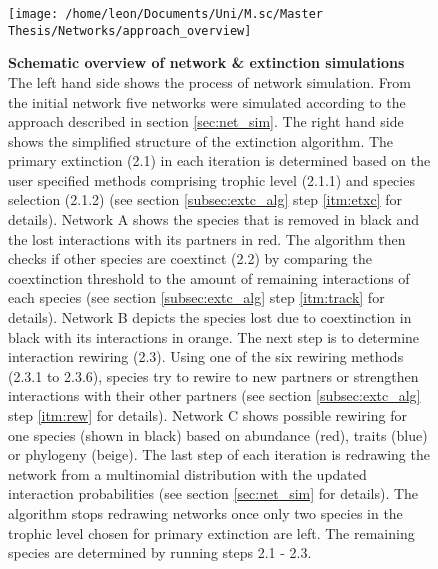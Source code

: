 \documentclass[12pt,a4paper]{article}
\begin{document}
	\begin{figure}[H]
	 \texttt{[image: /home/leon/Documents/Uni/M.sc/Master Thesis/Networks/approach\_overview]}
	 \caption{\textbf{Schematic overview of network \& extinction simulations} The left hand side shows the process of network simulation. From the initial network five networks were simulated according to the approach described in section \ref{sec:net_sim}. The right hand side shows the simplified structure of the extinction algorithm. The primary extinction (2.1) in each iteration is determined based on the user specified methods comprising trophic level (2.1.1) and species selection (2.1.2) (see section \ref{subsec:extc_alg} step \ref{itm:etxc} for details). Network A shows the species that is removed in black and the lost interactions with its partners in red. The algorithm then checks if other species are coextinct (2.2) by comparing the coextinction threshold to the amount of remaining interactions of each species (see section \ref{subsec:extc_alg} step \ref{itm:track} for details). Network B depicts the species lost due to coextinction in black with its interactions in orange. The next step is to determine interaction rewiring (2.3). Using one of the six rewiring methods (2.3.1 to 2.3.6), species try to rewire to new partners or strengthen interactions with their other partners (see section \ref{subsec:extc_alg} step \ref{itm:rew} for details). Network C shows possible rewiring for one species (shown in black) based on abundance (red), traits (blue) or phylogeny (beige).
	 The last step of each iteration is redrawing the network from a multinomial distribution with the updated interaction probabilities (see section \ref{sec:net_sim} for details). The algorithm stops redrawing networks once only two species in the trophic level chosen for primary extinction are left. The remaining species are determined by running steps 2.1 - 2.3.}
	 \label{fig:extc_alg}
\end{figure}
		\par


\end{document}
